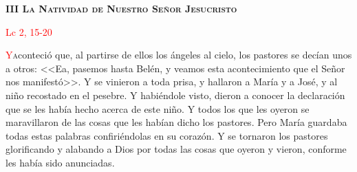 \begin{center}
    \textbf{\textsc{III La Natividad de Nuestro Señor Jesucristo}}

    \textcolor{red}{Lc 2, 15-20}
\end{center}

\lettrine[lines=2]{\textcolor{red}{Y}} aconteció que, al partirse de ellos los ángeles al cielo, los pastores se decían unos a otros: <<Ea, pasemos hasta Belén, y veamos esta acontecimiento
que el Señor nos manifestó>>. Y se vinieron a toda prisa, y hallaron a María y a José, y al niño recostado en el pesebre. Y habiéndole visto, dieron a conocer la declaración que se les había
hecho acerca de este niño. Y todos los que les oyeron se maravillaron de las cosas que les habían dicho los pastores. Pero María guardaba todas estas palabras confiriéndolas en su corazón.
Y se tornaron los pastores glorificando y alabando a Dios por todas las cosas que oyeron y vieron, conforme les había sido anunciadas.